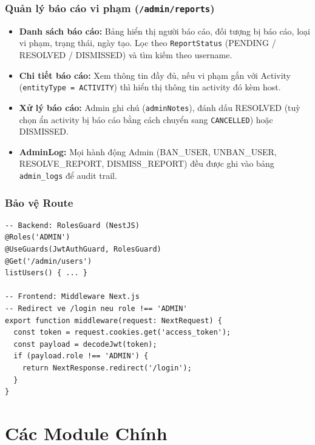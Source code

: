 \documentclass[12pt,a4paper]{article}
\begin{document}
\subsubsection{Quản lý báo cáo vi phạm (\texttt{/admin/reports})}

\begin{itemize}
  \item \textbf{Danh sách báo cáo:} Bảng hiển thị người báo cáo, đối tượng
        bị báo cáo, loại vi phạm, trạng thái, ngày tạo. Lọc theo
        \texttt{ReportStatus} (PENDING / RESOLVED / DISMISSED) và tìm kiếm
        theo username.
  \item \textbf{Chi tiết báo cáo:} Xem thông tin đầy đủ, nếu vi phạm gắn với
        Activity (\texttt{entityType = ACTIVITY}) thì hiển thị thông tin
        activity đó kèm host.
  \item \textbf{Xử lý báo cáo:} Admin ghi chú (\texttt{adminNotes}), đánh dấu
        RESOLVED (tuỳ chọn ẩn activity bị báo cáo bằng cách chuyển sang
        \texttt{CANCELLED}) hoặc DISMISSED.
  \item \textbf{AdminLog:} Mọi hành động Admin (BAN\_USER, UNBAN\_USER,
        RESOLVE\_REPORT, DISMISS\_REPORT) đều được ghi vào bảng
        \texttt{admin\_logs} để audit trail.
\end{itemize}

\subsubsection{Bảo vệ Route}

\begin{lstlisting}[language={}]
-- Backend: RolesGuard (NestJS)
@Roles('ADMIN')
@UseGuards(JwtAuthGuard, RolesGuard)
@Get('/admin/users')
listUsers() { ... }

-- Frontend: Middleware Next.js
-- Redirect ve /login neu role !== 'ADMIN'
export function middleware(request: NextRequest) {
  const token = request.cookies.get('access_token');
  const payload = decodeJwt(token);
  if (payload.role !== 'ADMIN') {
    return NextResponse.redirect('/login');
  }
}
\end{lstlisting}

\section{Các Module Chính}
\end{document}
